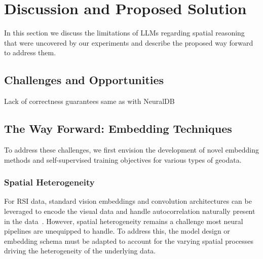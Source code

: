 \section{Discussion and Proposed Solution}
\label{section:proposal}

In this section we discuss the limitations of LLMs regarding spatial reasoning that were uncovered by our experiments and describe the proposed way forward to address them.

\subsection{Challenges and Opportunities}



Lack of correctness guarantees same as with NeuralDB

\subsection{The Way Forward: Embedding Techniques}
To address these challenges, we first envision the development of novel embedding methods and self-supervised training objectives for various types of geodata.

\subsubsection{Spatial Heterogeneity} %
For RSI data, standard vision embeddings and convolution architectures can be leveraged to encode the visual data and handle autocorrelation naturally present in the data~\cite{Xie2021}.
However, spatial heterogeneity remains a challenge most neural pipelines are unequipped to handle.
To address this, the model design or embedding schema must be adapted to account for the varying spatial processes driving the heterogeneity of the underlying data.

